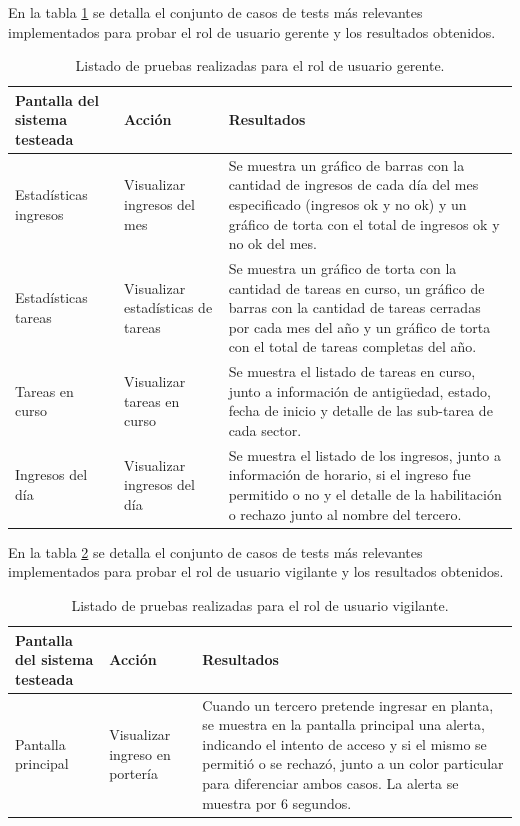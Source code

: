 En la tabla  \ref{tab:tablaTestsSistemaUsuGerente} se detalla el conjunto de casos de tests más relevantes implementados para probar el rol de usuario gerente y los resultados obtenidos. 

\begin{table}[h]
	\centering
	\caption[Tipos de pruebas sistema para el rol de usuario gerente]{Listado de pruebas realizadas para el rol de usuario gerente.}
	\begin{tabular}{p{3.5cm} p{2.5cm} p{7cm}}

		\toprule
		\textbf{Pantalla del sistema testeada} & 
		\textbf{Acción} & 
		\textbf{Resultados} 
		\\
		\midrule
Estadísticas ingresos & Visualizar ingresos del mes  & Se muestra un gráfico de barras con la cantidad de ingresos de cada día del mes especificado (ingresos ok y no ok) y un gráfico de torta con el total de ingresos ok y no ok del mes.  \\
Estadísticas tareas & Visualizar estadísticas de tareas  & Se muestra un gráfico de torta con la cantidad de tareas en curso, un gráfico de barras con la cantidad de tareas cerradas por cada mes del año y un gráfico de torta con el total de tareas completas del año.  \\
Tareas en curso & Visualizar tareas en curso
  & Se muestra el listado de tareas en curso, junto a información de antigüedad, estado, fecha de inicio y detalle de las sub-tarea de cada sector.  \\
Ingresos del día & Visualizar ingresos del día  & Se muestra el listado de los ingresos, junto a información de horario, si el ingreso fue permitido o no y el detalle de la habilitación o rechazo junto al nombre del tercero.  \\

		\bottomrule
		\hline
	\end{tabular}
	\label{tab:tablaTestsSistemaUsuGerente}
\end{table}

En la tabla  \ref{tab:tablaTestsSistemaUsuPorteria} se detalla el conjunto de casos de tests más relevantes implementados para probar el rol de usuario vigilante y los resultados obtenidos. 

\begin{table}[h]
	\centering
	\caption[Tipos de pruebas sistema para el rol de usuario vigilante]{Listado de pruebas realizadas para el rol de usuario vigilante.}
	\begin{tabular}{p{3.5cm} p{2.5cm} p{7cm}}

		\toprule
		\textbf{Pantalla del sistema testeada} & 
		\textbf{Acción} & 
		\textbf{Resultados} 
		\\
		\midrule
Pantalla principal & Visualizar ingreso en portería  & Cuando un tercero pretende ingresar en planta, se muestra en la pantalla principal una alerta, indicando el intento de acceso y si el mismo se permitió o se rechazó, junto a un color particular para diferenciar ambos casos. La alerta se muestra por 6 segundos. \\
		\bottomrule
		\hline
	\end{tabular}
	\label{tab:tablaTestsSistemaUsuPorteria}
\end{table}


